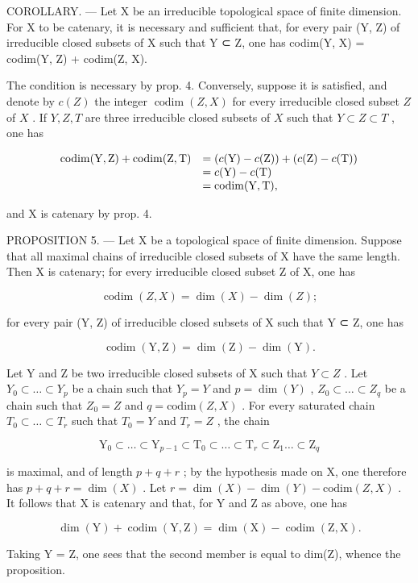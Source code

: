 COROLLARY. — Let X be an irreducible topological space of finite dimension. For X to be catenary, it is necessary and sufficient that, for every pair (Y, Z) of irreducible closed subsets of X such that Y ⊂ Z, one has codim(Y, X) = codim(Y, Z) + codim(Z, X).

The condition is necessary by prop. 4. Conversely, suppose it is satisfied, and denote by \(c(Z)\) the integer \(\operatorname{codim}(Z,X)\) for every irreducible closed subset \(Z\) of \(X\) . If \(Y,Z,T\) are three irreducible closed subsets of \(X\) such that \(Y\subset Z\subset T\) , one has

\[
\begin{array}{r l} \operatorname{codim} (\mathrm{Y}, \mathrm{Z}) + \operatorname{codim} (\mathrm{Z}, \mathrm{T}) & = (c (\mathrm{Y}) - c (\mathrm{Z})) + (c (\mathrm{Z}) - c (\mathrm{T})) \\ & = c (\mathrm{Y}) - c (\mathrm{T}) \\ & = \operatorname{codim} (\mathrm{Y}, \mathrm{T}), \end{array}
\]

and X is catenary by prop. 4.

PROPOSITION 5. — Let X be a topological space of finite dimension. Suppose that all maximal chains of irreducible closed subsets of X have the same length. Then X is catenary; for every irreducible closed subset Z of X, one has

\[
\operatorname{codim} (Z, X) = \dim (X) - \dim (Z);
\]

for every pair (Y, Z) of irreducible closed subsets of X such that Y ⊂ Z, one has

\[
\operatorname{codim} (\mathrm{Y}, \mathrm{Z}) = \dim (\mathrm{Z}) - \dim (\mathrm{Y}).
\]

Let Y and Z be two irreducible closed subsets of X such that \(Y \subset Z\) . Let \(Y_{0} \subset \ldots \subset Y_{p}\) be a chain such that \(Y_{p} = Y\) and \(p = \dim(Y)\) , \(Z_{0} \subset \ldots \subset Z_{q}\) be a chain such that \(Z_{0} = Z\) and \(q = \text{codim}(Z, X)\) . For every saturated chain \(T_{0} \subset \ldots \subset T_{r}\) such that \(T_{0} = Y\) and \(T_{r} = Z\) , the chain

\[
\mathrm{Y} _ {0} \subset \dots \subset \mathrm{Y} _ {p - 1} \subset \mathrm{T} _ {0} \subset \dots \subset \mathrm{T} _ {r} \subset \mathrm{Z} _ {1} \dots \subset \mathrm{Z} _ {q}
\]

is maximal, and of length \(p + q + r\) ; by the hypothesis made on X, one therefore has \(p + q + r = \dim(X)\) . Let \(r = \dim(X) - \dim(Y) - \text{codim}(Z, X)\) . It follows that X is catenary and that, for Y and Z as above, one has

\[
\dim (\mathrm{Y}) + \operatorname{codim} (\mathrm{Y}, \mathrm{Z}) = \dim (\mathrm{X}) - \operatorname{codim} (\mathrm{Z}, \mathrm{X}).
\]

Taking Y = Z, one sees that the second member is equal to dim(Z), whence the proposition.

